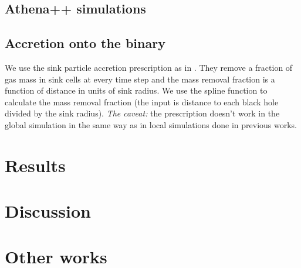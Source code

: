 \documentclass[twocolumn]{aastex631}
\begin{document}
\subsection{Athena++ simulations}

\subsection{Accretion onto the binary}
We use the sink particle accretion prescription as in \citet{Munoz2019}. They remove a fraction of gas mass in sink cells at every time step and the mass removal fraction is a function of distance in units of sink radius. We use the spline function to calculate the mass removal fraction (the input is distance to each black hole divided by the sink radius).
\textit{The caveat:} the prescription doesn't work in the global simulation in the same way as in local simulations done in previous works. 

\section{Results}
\label{sec:results}

\section{Discussion} 
\label{sec:conclusion}

\section{Other works}




\end{document}
